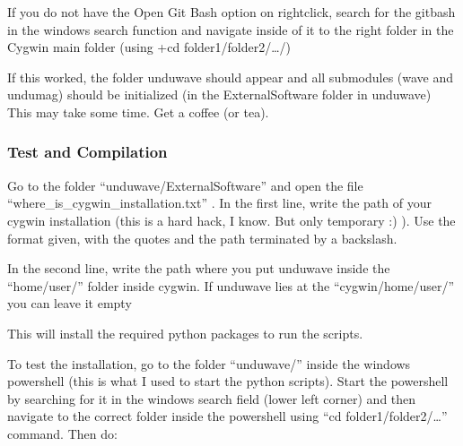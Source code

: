 \documentclass[letterpaper,10pt,english]{sphinxmanual}
\begin{document}
\begin{sphinxVerbatim}[commandchars=\\\{\}]
\end{sphinxVerbatim}

\sphinxAtStartPar
If you do not have the Open Git Bash option on right\sphinxhyphen{}click, search for the git\sphinxhyphen{}bash in the windows search function and navigate inside of it to the right folder in the Cygwin main folder (using +cd folder1/folder2/…/)

\begin{DUlineblock}{0em}
\item[] If this worked, the folder unduwave should appear and all submodules (wave and undumag) should be initialized (in the External\sphinxhyphen{}Software folder in unduwave) This may take some time. Get a coffee (or tea).
\end{DUlineblock}


\subsubsection{Test and Compilation}
\label{\detokenize{installation:test-and-compilation}}
\begin{DUlineblock}{0em}
\item[] Go to the folder “unduwave/External\sphinxhyphen{}Software” and open the file “where\_is\_cygwin\_installation.txt” . In the first line, write the path of your cygwin installation (this is a hard hack, I know. But only temporary :) ). Use the format given, with the quotes and the path terminated by a backslash.
\end{DUlineblock}

\begin{DUlineblock}{0em}
\item[] In the second line, write the path where you put unduwave inside the “home/user/” folder inside cygwin. If unduwave lies at the “cygwin/home/user/” you can leave it empty
\end{DUlineblock}

\sphinxAtStartPar
This will install the required python packages to run the scripts.

\begin{DUlineblock}{0em}
\item[] To test the installation, go to the folder “unduwave/” inside the windows powershell (this is what I used to start the python scripts). Start the powershell by searching for it in the windows search field (lower left corner) and then navigate to the correct folder inside the powershell using “cd folder1/folder2/…” command. Then do:
\end{DUlineblock}
\end{document}
